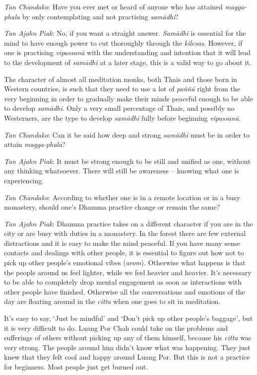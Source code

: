 \emph{Tan Chandako}: Have you ever met or heard of anyone who has
attained \emph{magga-phala} by only contemplating and not practising
\emph{samādhi}? 

\emph{Tan Ajahn Piak}: No, if you want a straight answer. \emph{Samādhi}
is essential for the mind to have enough power to cut thoroughly through
the \emph{kilesas}. However, if one is practising \emph{vipassanā} with
the understanding and intention that it will lead to the development of
\emph{samādhi} at a later stage, this is a valid way to go about it. 

The character of almost all meditation monks, both Thais and those born
in Western countries, is such that they need to use a lot of
\emph{paññā} right from the very beginning in order to gradually make
their minds peaceful enough to be able to develop \emph{samādhi}. Only a
very small percentage of Thais, and possibly no Westerners, are the type
to develop \emph{samādhi} fully before beginning \emph{vipassanā}. 

\emph{Tan Chandako}: Can it be said how deep and strong \emph{samādhi}
must be in order to attain \emph{magga-phala}? 

\emph{Tan Ajahn Piak}: It must be strong enough to be still and unified
as one, without any thinking whatsoever. There will still be awareness
-- knowing what one is experiencing. 

\emph{Tan Chandako}: According to whether one is in a remote location or
in a busy monastery, should one's Dhamma practice change or remain the
same? 

\emph{Tan Ajahn Piak}: Dhamma practice takes on a different character if
you are in the city or are busy with duties in a monastery. In the
forest there are few external distractions and it is easy to make the
mind peaceful. If you have many sense contacts and dealings with other
people, it is essential to figure out how not to pick up other people's
emotional vibes (\emph{arom}). Otherwise what happens is that the people
around us feel lighter, while we feel heavier and heavier. It's
necessary to be able to completely drop mental engagement as soon as
interactions with other people have finished. Otherwise all the
conversations and emotions of the day are floating around in the
\emph{citta} when one goes to sit in meditation. 

It's easy to say, `Just be mindful' and `Don't pick up other people's
baggage', but it is very difficult to do. Luang Por Chah could take on
the problems and sufferings of others without picking up any of them
himself, because his \emph{citta} was very strong. The people around him
didn't know what was happening. They just knew that they felt cool and
happy around Luang Por. But this is not a practice for beginners. Most
people just get burned out.

